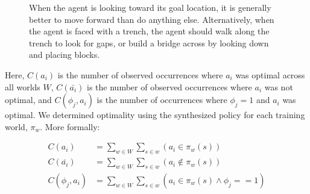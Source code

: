 \documentclass[letterpaper]{article}
\begin{document}
\begin{figure}[H]
\centering
{}
\label{fig:example_affs}
\caption{When the agent is looking toward its goal location, it is generally better to move forward than do anything else. Alternatively, when the agent is faced with a trench, the agent should walk along the trench to look for gaps, or build a bridge across by looking down and placing blocks.}
\end{figure}

Here, $C(a_i)$ is the number of observed occurrences where $a_i$ was optimal across all worlds $W$,
$C(\bar{a_i})$ is the number of observed occurrences where $a_i$ was not optimal,
and $C(\phi_j, a_i)$ is the number of occurrences where $\phi_j=1$ and $a_i$ was optimal.
We determined optimality using the synthesized policy for each training world, $\pi_w$. More formally:

\begin{align}
C(a_i) &= \sum_{w \in W} \sum_{s \in w} (a_i \in \pi_w(s)) \\
C(\bar{a_i}) &= \sum_{w \in W} \sum_{s \in w} (a_i \not \in \pi_w(s) ) \\
C(\phi_j, a_i) &= \sum_{w \in W} \sum_{s \in w} (a_i  \in \pi_w(s) \wedge \phi_j == 1)
\end{align}
\end{document}

